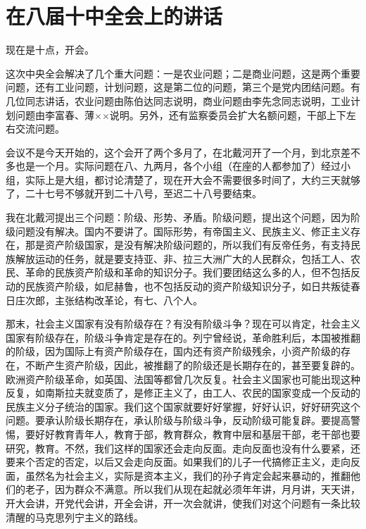 \section[在八届十中全会上的讲话（一九六二年九月二十四日上午怀仁堂）]{在八届十中全会上的讲话}


现在是十点，开会。

这次中央全会解决了几个重大问题：一是农业问题；二是商业问题，这是两个重要问题，还有工业问题，计划问题，这是第二位的问题，第三个是党内团结问题。有几位同志讲话，农业问题由陈伯达同志说明，商业问题由李先念同志说明，工业计划问题由李富春、薄××说明。另外，还有监察委员会扩大名额问题，干部上下左右交流问题。

会议不是今天开始的，这个会开了两个多月了，在北戴河开了一个月，到北京差不多也是一个月。实际问题在八、九两月，各个小组（在座的人都参加了）经过小组，实际上是大组，都讨论清楚了，现在开大会不需要很多时间了，大约三天就够了，二十七号不够就开到二十八号，至迟二十八号要结束。

我在北戴河提出三个问题：阶级、形势、矛盾。阶级问题，提出这个问题，因为阶级问题没有解决。国内不要讲了。国际形势，有帝国主义、民族主义、修正主义存在，那是资产阶级国家，是没有解决阶级问题的，所以我们有反帝任务，有支持民族解放运动的任务，就是要支持亚、非、拉三大洲广大的人民群众，包括工人、农民、革命的民族资产阶级和革命的知识分子。我们要团结这么多的人，但不包括反动的民族资产阶级，如尼赫鲁，也不包括反动的资产阶级知识分子，如日共叛徒春日庄次郎，主张结构改革论，有七、八个人。

那末，社会主义国家有没有阶级存在？有没有阶级斗争？现在可以肯定，社会主义国家有阶级存在，阶级斗争肯定是存在的。列宁曾经说，革命胜利后，本国被推翻的阶级，因为国际上有资产阶级存在，国内还有资产阶级残余，小资产阶级的存在，不断产生资产阶级，因此，被推翻了的阶级还是长期存在的，甚至要复辟的。欧洲资产阶级革命，如英国、法国等都曾几次反复。社会主义国家也可能出现这种反复，如南斯拉夫就变质了，是修正主义了，由工人、农民的国家变成一个反动的民族主义分子统治的国家。我们这个国家就要好好掌握，好好认识，好好研究这个问题。要承认阶级长期存在，承认阶级与阶级斗争，反动阶级可能复辟。要提高警惕，要好好教育青年人，教育于部，教育群众，教育中层和基层干部，老干部也要研究，教育。不然，我们这样的国家还会走向反面。走向反面也没有什么要紧，还要来个否定的否定，以后又会走向反面。如果我们的儿子一代搞修正主义，走向反面，虽然名为社会主义，实际是资本主义，我们的孙子肯定会起来暴动的，推翻他们的老子，因为群众不满意。所以我们从现在起就必须年年讲，月月讲，天天讲，开大会讲，开党代会讲，开全会讲，开一次会就讲，使我们对这个问题有一条比较清醒的马克思列宁主义的路线。

